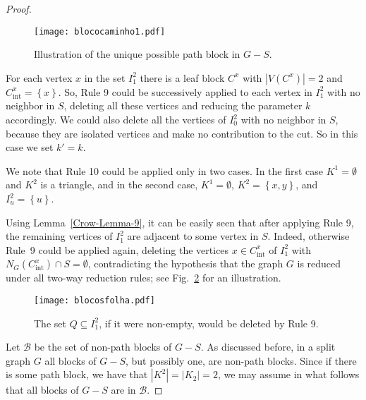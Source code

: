 \documentclass[
final
]{dmtcs-episciences}
\begin{document}
\begin{proof}
     \begin{figure}[h!]
\begin{center} \texttt{[image: blococaminho1.pdf]}
\caption{Illustration of the unique possible path block in $G-S$.} \label{fig:path-block} \end{center}
\end{figure}

\newpage 

     For each vertex $x$ in the set $I^2_1$ there is a leaf block $C^x$ with $|V(C^x)|=2$ and $C^x_{\text{int}}=\left\{x\right\}$. So, Rule 9 could be successively applied to each vertex in $I^2_1$ with no neighbor in $S$, deleting all these vertices and reducing the parameter $k$ accordingly.	We could also delete all the vertices of $I^2_0$ with no neighbor in $S$, because they are isolated vertices and make no contribution to the cut. So in this case we set $k'=k$.

     We note that Rule 10 could be applied only in two cases. In the first case $K^1=\emptyset$ and $K^2$ is a triangle, and in the second case, $K^1=\emptyset$, $K^2=\left\{x,y\right\}$, and $I^2_u=\left\{u\right\}$.

	Using Lemma~\ref{Crow-Lemma-9}, it can be easily seen that after applying Rule 9, the remaining vertices of $I^2_1$ are adjacent to some vertex in $S$. Indeed, otherwise  Rule~9 could be applied again, deleting the vertices $x\in C^x_{\text{int}}$ of $I^2_1$ with $N_G(C^x_{\text{int}})\cap S=\emptyset$, contradicting the hypothesis that the graph $G$ is reduced under all two-way reduction rules; see Fig.~\ref{fig:blocosfolha} for an illustration.


     \begin{figure}[h!]
\begin{center} \texttt{[image: blocosfolha.pdf]}
\caption{The set $Q \subseteq I_1^2$, if it were non-empty, would be deleted by Rule 9.} \label{fig:blocosfolha} \end{center}
\end{figure}

	Let $\mathcal{B}$ be the set of non-path blocks of $G-S$. As discussed before,  in a split graph $G$  all blocks of $G-S$, but possibly one, are non-path blocks. Since if there is some path block, we have that $|K^2|= |K_2 |=2$, we may assume in what follows that all blocks of $G-S$ are in $\mathcal{B}$.




\end{proof}
\end{document}
